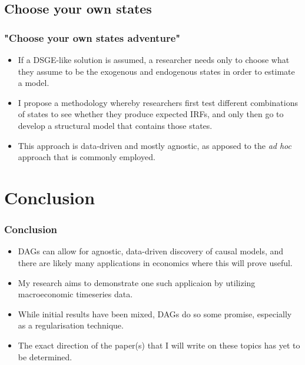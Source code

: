 \documentclass{beamer}
\begin{document}
\subsection{Choose your own states}
\begin{frame}
    \frametitle{"Choose your own states adventure"}
    \begin{itemize}
        \item If a DSGE-like solution is assumed, a researcher needs only to choose what they assume to be the exogenous and endogenous states in order to estimate a model.
        \item I propose a methodology whereby researchers first test different combinations of states to see whether they produce expected IRFs, and only then go to develop a structural model that contains those states.
        \item This approach is data-driven and mostly agnostic, as apposed to the \textit{ad hoc} approach that is commonly employed.
    \end{itemize}
\end{frame}

\section{Conclusion}
\begin{frame}
    \frametitle{Conclusion}
    \begin{itemize}
        \item DAGs can allow for agnostic, data-driven discovery of causal models, and there are likely many applications in economics where this will prove useful.
        \item My research aims to demonstrate one such applicaion by utilizing macroeconomic timeseries data.
        \item While initial results have been mixed, DAGs do so some promise, especially as a regularisation technique.
        \item The exact direction of the paper(s) that I will write on these topics has yet to be determined.
    \end{itemize}
\end{frame}
\end{document}
